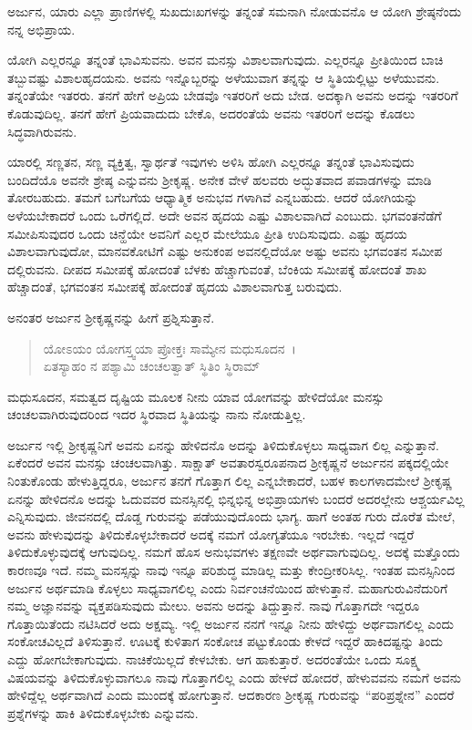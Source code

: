 {\small ಅರ್ಜುನ, ಯಾರು ಎಲ್ಲಾ ಪ್ರಾಣಿಗಳಲ್ಲಿ ಸುಖದುಃಖಗಳನ್ನು ತನ್ನಂತೆ ಸಮನಾಗಿ ನೋಡುವನೊ ಆ ಯೋಗಿ ಶ್ರೇಷ್ಠನೆಂದು ನನ್ನ ಅಭಿಪ್ರಾಯ.}

ಯೋಗಿ ಎಲ್ಲರನ್ನೂ ತನ್ನಂತೆ ಭಾವಿಸುವನು. ಅವನ ಮನಸ್ಸು ವಿಶಾಲವಾಗುವುದು. ಎಲ್ಲರನ್ನೂ ಪ್ರೀತಿಯಿಂದ ಬಾಚಿ ತಬ್ಬುವಷ್ಟು ವಿಶಾಲಹೃದಯನು. ಅವನು ಇನ್ನೊಬ್ಬರನ್ನು ಅಳೆಯುವಾಗ ತನ್ನನ್ನು ಆ ಸ್ಥಿತಿಯಲ್ಲಿಟ್ಟು ಅಳೆಯುವನು. ತನ್ನಂತೆಯೇ ಇತರರು. ತನಗೆ ಹೇಗೆ ಅಪ್ರಿಯ ಬೇಡವೊ ಇತರರಿಗೆ ಅದು ಬೇಡ. ಅದಕ್ಕಾಗಿ ಅವನು ಅದನ್ನು ಇತರರಿಗೆ ಕೊಡುವುದಿಲ್ಲ. ತನಗೆ ಹೇಗೆ ಪ್ರಿಯವಾದುದು ಬೇಕೊ, ಅದರಂತೆಯೆ ಅವನು ಇತರರಿಗೆ ಅದನ್ನು ಕೊಡಲು ಸಿದ್ಧವಾಗಿರುವನು.

ಯಾರಲ್ಲಿ ಸಣ್ಣತನ, ಸಣ್ಣ ವ್ಯಕ್ತಿತ್ವ, ಸ್ವಾರ್ಥತೆ ಇವುಗಳು ಅಳಿಸಿ ಹೋಗಿ ಎಲ್ಲರನ್ನೂ ತನ್ನಂತೆ ಭಾವಿಸುವುದು ಬಂದಿದೆಯೊ ಅವನೇ ಶ್ರೇಷ್ಠ ಎನ್ನುವನು ಶ‍್ರೀಕೃಷ್ಣ. ಅನೇಕ ವೇಳೆ ಹಲವರು ಅದ್ಭುತವಾದ ಪವಾಡಗಳನ್ನು ಮಾಡಿ ತೋರಬಹುದು. ತಮಗೆ ಬಗೆಬಗೆಯ ಆಧ್ಯಾತ್ಮಿಕ ಅನುಭವ ಗಳಾಗಿವೆ ಎನ್ನಬಹುದು. ಆದರೆ ಯೋಗಿಯನ್ನು ಅಳೆಯಬೇಕಾದರೆ ಒಂದು ಒರೆಗಲ್ಲಿದೆ. ಅದೇ ಅವನ ಹೃದಯ ಎಷ್ಟು ವಿಶಾಲವಾಗಿದೆ ಎಂಬುದು. ಭಗವಂತನೆಡೆಗೆ ಸಮೀಪಿಸುವುದರ ಒಂದು ಚಿನ್ಹೆಯೇ ಅವನಿಗೆ ಎಲ್ಲರ ಮೇಲೆಯೂ ಪ್ರೀತಿ ಉದಿಸುವುದು. ಎಷ್ಟು ಹೃದಯ ವಿಶಾಲವಾಗುವುದೋ, ಮಾನವಕೋಟಿಗೆ ಎಷ್ಟು ಅನುಕಂಪ ಅವನಲ್ಲಿದೆಯೋ ಅಷ್ಟು ಅವನು ಭಗವಂತನ ಸಮೀಪ ದಲ್ಲಿರುವನು. ದೀಪದ ಸಮೀಪಕ್ಕೆ ಹೋದಂತೆ ಬೆಳಕು ಹೆಚ್ಚಾಗುವಂತೆ, ಬೆಂಕಿಯ ಸಮೀಪಕ್ಕೆ ಹೋದಂತೆ ಶಾಖ ಹೆಚ್ಚಾದಂತೆ, ಭಗವಂತನ ಸಮೀಪಕ್ಕೆ ಹೋದಂತೆ ಹೃದಯ ವಿಶಾಲವಾಗುತ್ತ ಬರುವುದು.

ಅನಂತರ ಅರ್ಜುನ ಶ‍್ರೀಕೃಷ್ಣನನ್ನು ಹೀಗೆ ಪ್ರಶ್ನಿಸುತ್ತಾನೆ.

\begin{verse}
ಯೋಽಯಂ ಯೋಗಸ್ತ್ವಯಾ ಪ್ರೋಕ್ತಃ ಸಾಮ್ಯೇನ ಮಧುಸೂದನ~।\\ಏತಸ್ಯಾಹಂ ನ ಪಶ್ಯಾಮಿ ಚಂಚಲತ್ವಾತ್ ಸ್ಥಿತಿಂ ಸ್ಥಿರಾಮ್ 
\end{verse}

{\small ಮಧುಸೂದನ, ಸಮತ್ವದ ದೃಷ್ಟಿಯ ಮೂಲಕ ನೀನು ಯಾವ ಯೋಗವನ್ನು ಹೇಳಿದೆಯೋ ಮನಸ್ಸು ಚಂಚಲವಾಗಿರುವುದರಿಂದ ಇದರ ಸ್ಥಿರವಾದ ಸ್ಥಿತಿಯನ್ನು ನಾನು ನೋಡುತ್ತಿಲ್ಲ.}

ಅರ್ಜುನ ಇಲ್ಲಿ ಶ‍್ರೀಕೃಷ್ಣನಿಗೆ ಅವನು ಏನನ್ನು ಹೇಳಿದನೊ ಅದನ್ನು ತಿಳಿದುಕೊಳ್ಳಲು ಸಾಧ್ಯವಾಗ ಲಿಲ್ಲ ಎನ್ನುತ್ತಾನೆ. ಏಕೆಂದರೆ ಅವನ ಮನಸ್ಸು ಚಂಚಲವಾಗಿತ್ತು. ಸಾಕ್ಷಾತ್ ಅವತಾರಸ್ವರೂಪನಾದ ಶ‍್ರೀಕೃಷ್ಣನೆ ಅರ್ಜುನನ ಪಕ್ಕದಲ್ಲಿಯೇ ನಿಂತುಕೊಂಡು ಹೇಳುತ್ತಿದ್ದರೂ, ಅರ್ಜುನ ತನಗೆ ಗೊತ್ತಾಗ ಲಿಲ್ಲ ಎನ್ನಬೇಕಾದರೆ, ಬಹಳ ಕಾಲಗಳಾದಮೇಲೆ ಶ‍್ರೀಕೃಷ್ಣ ಏನನ್ನು ಹೇಳಿದನೊ ಅದನ್ನು ಓದುವವರ ಮನಸ್ಸಿನಲ್ಲಿ ಭಿನ್ನಭಿನ್ನ ಅಭಿಪ್ರಾಯಗಳು ಬಂದರೆ ಅದರಲ್ಲೇನು ಆಶ್ಚರ್ಯವಿಲ್ಲ ಎನ್ನಿಸುವುದು. ಜೀವನದಲ್ಲಿ ದೊಡ್ಡ ಗುರುವನ್ನು ಪಡೆಯುವುದೊಂದು ಭಾಗ್ಯ. ಹಾಗೆ ಅಂತಹ ಗುರು ದೊರೆತ ಮೇಲೆ, ಅವನು ಹೇಳುವುದನ್ನು ತಿಳಿದುಕೊಳ್ಳಬೇಕಾದರೆ ಅದಕ್ಕೆ ನಮಗೆ ಯೋಗ್ಯತೆಯೂ ಇರಬೇಕು. ಇಲ್ಲದೆ ಇದ್ದರೆ ತಿಳಿದುಕೊಳ್ಳುವುದಕ್ಕೆ ಆಗುವುದಿಲ್ಲ. ನಮಗೆ ಹೊಸ ಅನುಭವಗಳು ತಕ್ಷಣವೇ ಅರ್ಥವಾಗುವುದಿಲ್ಲ. ಅದಕ್ಕೆ ಮತ್ತೊಂದು ಕಾರಣವೂ ಇದೆ. ನಮ್ಮ ಮನಸ್ಸನ್ನು ನಾವು ಇನ್ನೂ ಪರಿಶುದ್ಧ ಮಾಡಿಲ್ಲ ಮತ್ತು ಕೇಂದ್ರೀಕರಿಸಿಲ್ಲ. ಇಂತಹ ಮನಸ್ಸಿನಿಂದ ಅರ್ಜುನ ಅರ್ಥಮಾಡಿ ಕೊಳ್ಳಲು ಸಾಧ್ಯವಾಗಲಿಲ್ಲ ಎಂದು ನಿರ್ವಂಚನೆಯಿಂದ ಹೇಳುತ್ತಾನೆ. ಮಹಾಗುರುವಿನೆದುರಿಗೆ ನಮ್ಮ ಅಜ್ಞಾನವನ್ನು ವ್ಯಕ್ತಪಡಿಸುವುದು ಮೇಲು. ಅವನು ಅದನ್ನು ತಿದ್ದುತ್ತಾನೆ. ನಾವು ಗೊತ್ತಾಗದೇ ಇದ್ದರೂ ಗೊತ್ತಾಯಿತೆಂದು ನಟಿಸಿದರೆ ಅದು ಅಕ್ಷಮ್ಯ. ಇಲ್ಲಿ ಅರ್ಜುನ ನನಗೆ ಇನ್ನೂ ನೀನು ಹೇಳಿದ್ದು ಅರ್ಥವಾಗಲಿಲ್ಲ ಎಂದು ಸಂಕೋಚವಿಲ್ಲದೆ ತಿಳಿಸುತ್ತಾನೆ. ಊಟಕ್ಕೆ ಕುಳಿತಾಗ ಸಂಕೋಚ ಪಟ್ಟುಕೊಂಡು ಕೇಳದೆ ಇದ್ದರೆ ಹಾಕಿದಷ್ಟನ್ನು ತಿಂದು ಎದ್ದು ಹೋಗಬೇಕಾಗುವುದು. ನಾಚಿಕೆಯಿಲ್ಲದೆ ಕೇಳಬೇಕು. ಆಗ ಹಾಕುತ್ತಾರೆ. ಅದರಂತೆಯೇ ಒಂದು ಸೂಕ್ಷ್ಮ ವಿಷಯವನ್ನು ತಿಳಿದುಕೊಳ್ಳುವಾಗಲೂ ನಾವು ಗೊತ್ತಾಗಲಿಲ್ಲ ಎಂದು ಹೇಳದೆ ಹೋದರೆ, ಹೇಳುವವನು ನಮಗೆ ಅವನು ಹೇಳಿದ್ದೆಲ್ಲ ಅರ್ಥವಾಗಿದೆ ಎಂದು ಮುಂದಕ್ಕೆ ಹೋಗುತ್ತಾನೆ. ಆದಕಾರಣ ಶ‍್ರೀಕೃಷ್ಣ ಗುರುವನ್ನು “ಪರಿಪ್ರಶ್ನೇನ” ಎಂದರೆ ಪ್ರಶ್ನೆಗಳನ್ನು ಹಾಕಿ ತಿಳಿದುಕೊಳ್ಳಬೇಕು ಎನ್ನುವನು.

